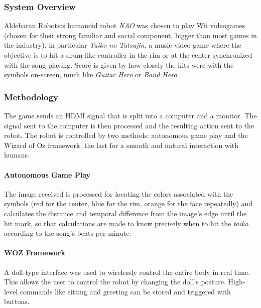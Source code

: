 \documentclass[runningheads]{llncs}
\begin{document}
\subsubsection{System Overview}
\par Aldebaran Robotics humanoid robot \textit{NAO} was chosen to play Wii videogames (chosen for their strong familiar and social component, bigger than most games in the industry), in particular \textit{Taiko no Tatsujin}, a music video game where the objective is to hit a drum-like controller in the rim or at the center synchronized with the song playing. Score is given by how closely the hits were with the symbols on-screen, much like \textit{Guitar Hero} or \textit{Band Hero}.

\subsubsection{Methodology}
\par The game sends an HDMI signal that is split into a computer and a monitor. The signal sent to the computer is then processed and the resulting action sent to the robot. The robot is controlled by two methods: autonomous game play and the Wizard of Oz framework, the last for a smooth and natural interaction with humans.
\paragraph{Autonomous Game Play} The image received is processed for locating the colors associated with the symbols (red for the center, blue for the rim, orange for the face repeatedly) and calculates the distance and temporal difference from the image's edge until the hit mark, so that calculations are made to know precisely when to hit the \textit{taiko} according to the song's beats per minute.
\paragraph{WOZ Framework} A doll-type interface was used to wirelessly control the entire body in real time. This allows the user to control the robot by changing the doll's posture. High-level commands like sitting and greeting can be stored and triggered with buttons.
\end{document}
